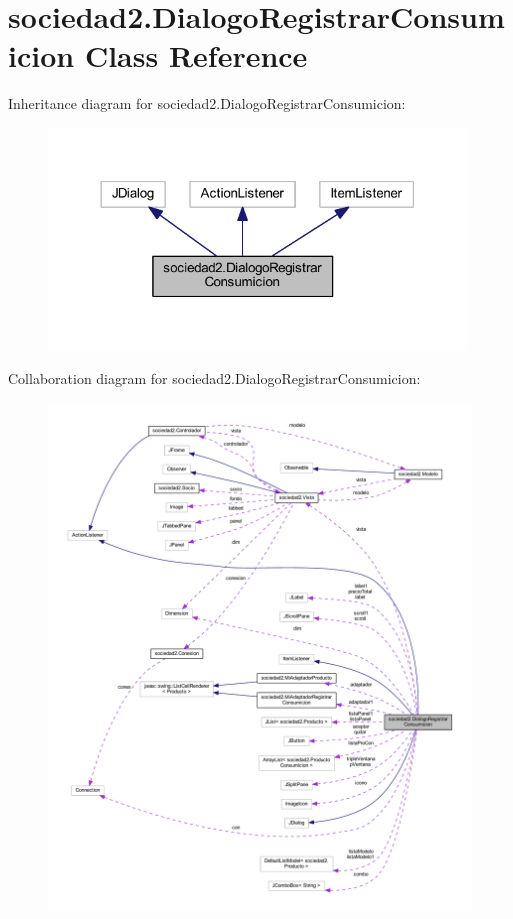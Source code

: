 \hypertarget{classsociedad2_1_1_dialogo_registrar_consumicion}{}\section{sociedad2.\+Dialogo\+Registrar\+Consumicion Class Reference}
\label{classsociedad2_1_1_dialogo_registrar_consumicion}


Inheritance diagram for sociedad2.\+Dialogo\+Registrar\+Consumicion\+:\nopagebreak
\begin{figure}[H]
\begin{center}
\leavevmode
\includegraphics[width=314pt]{classsociedad2_1_1_dialogo_registrar_consumicion__inherit__graph}
\end{center}
\end{figure}


Collaboration diagram for sociedad2.\+Dialogo\+Registrar\+Consumicion\+:
\nopagebreak
\begin{figure}[H]
\begin{center}
\leavevmode
\includegraphics[width=350pt]{classsociedad2_1_1_dialogo_registrar_consumicion__coll__graph}
\end{center}
\end{figure}
